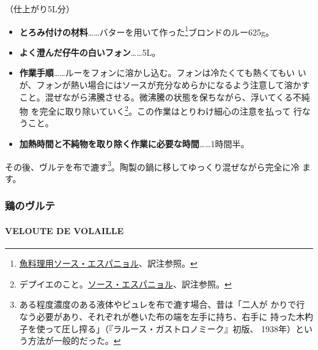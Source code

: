  

（仕上がり5L分）

\begin{itemize}
\item
  \textbf{とろみ付けの材料}\ldots{}\ldots{}バターを用いて作った\footnote{\protect\hyperlink{sauce-espagnole-maigre}{魚料理用ソース・エスパニョル}、訳注参照。}ブロンドのルー625g。
\item
  \textbf{よく澄んだ仔牛の白いフォン}\ldots{}\ldots{}5L。
\item
  \textbf{作業手順}\ldots{}\ldots{}ルーをフォンに溶かし込む。フォンは冷たくても熱くてもい
  いが、フォンが熱い場合にはソースが充分なめらかになるよう注意して溶かす
  こと。混ぜながら沸騰させる。微沸騰の状態を保ちながら、浮いてくる不純物
  を完全に取り除いていく\footnote{デプイエのこと。\protect\hyperlink{sauce-espagnole}{ソース・エスパニョル}、訳注参照。}。この作業はとりわけ細心の注意を払って
  行なうこと。
\item
  \textbf{加熱時間と不純物を取り除く作業に必要な時間}\ldots{}\ldots{}1時間半。
\end{itemize}

その後、ヴルテを布で漉す\footnote{ある程度濃度のある液体やピュレを布で漉す場合、昔は「二人が
  かりで行なう必要があり、それぞれが巻いた布の端を左手に持ち、右手に
  持った木杓子を使って圧し搾る」（『ラルース・ガストロノミーク』初版、
  1938年）という方法が一般的だった。}。陶製の鍋に移してゆっくり混ぜながら完全に冷
ます。

\maeaki

\hypertarget{ux9d8fux306eux30f4ux30ebux30c6}{%
\subsubsection{鶏のヴルテ}\label{ux9d8fux306eux30f4ux30ebux30c6}}

\hypertarget{veloute-de-volaille}{%
\paragraph{VELOUTE DE VOLAILLE}\label{veloute-de-volaille}}


